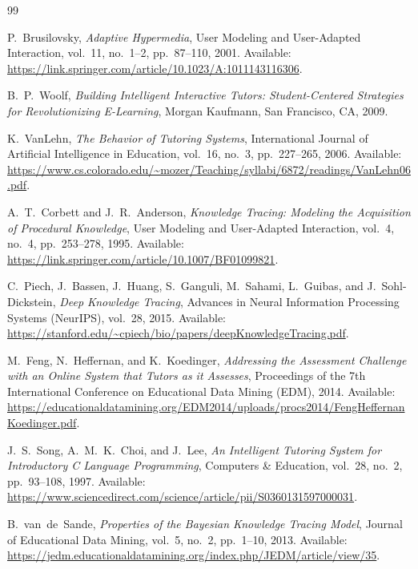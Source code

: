\documentclass{article}
\begin{document}
\newpage
\begin{thebibliography}{99}

P.~Brusilovsky,
\textit{Adaptive Hypermedia},
User Modeling and User-Adapted Interaction, vol.~11, no.~1--2, pp.~87--110, 2001.
Available: \url{https://link.springer.com/article/10.1023/A:1011143116306}.

B.~P.~Woolf,
\textit{Building Intelligent Interactive Tutors: Student-Centered Strategies for Revolutionizing E-Learning},
Morgan Kaufmann, San Francisco, CA, 2009.

K.~VanLehn,
\textit{The Behavior of Tutoring Systems},
International Journal of Artificial Intelligence in Education, vol.~16, no.~3, pp.~227--265, 2006.
Available: \url{https://www.cs.colorado.edu/~mozer/Teaching/syllabi/6872/readings/VanLehn06.pdf}.

A.~T.~Corbett and J.~R.~Anderson,
\textit{Knowledge Tracing: Modeling the Acquisition of Procedural Knowledge},
User Modeling and User-Adapted Interaction, vol.~4, no.~4, pp.~253--278, 1995.
Available: \url{https://link.springer.com/article/10.1007/BF01099821}.

C.~Piech, J.~Bassen, J.~Huang, S.~Ganguli, M.~Sahami, L.~Guibas, and J.~Sohl-Dickstein,
\textit{Deep Knowledge Tracing},
Advances in Neural Information Processing Systems (NeurIPS), vol.~28, 2015.
Available: \url{https://stanford.edu/~cpiech/bio/papers/deepKnowledgeTracing.pdf}.

M.~Feng, N.~Heffernan, and K.~Koedinger,
\textit{Addressing the Assessment Challenge with an Online System that Tutors as it Assesses},
Proceedings of the 7th International Conference on Educational Data Mining (EDM), 2014.
Available: \url{https://educationaldatamining.org/EDM2014/uploads/procs2014/FengHeffernanKoedinger.pdf}.

J.~S.~Song, A.~M.~K.~Choi, and J.~Lee,
\textit{An Intelligent Tutoring System for Introductory C Language Programming},
Computers \& Education, vol.~28, no.~2, pp.~93--108, 1997.
Available: \url{https://www.sciencedirect.com/science/article/pii/S0360131597000031}.

B.~van~de~Sande,
\textit{Properties of the Bayesian Knowledge Tracing Model},
Journal of Educational Data Mining, vol.~5, no.~2, pp.~1--10, 2013.
Available: \url{https://jedm.educationaldatamining.org/index.php/JEDM/article/view/35}.


\end{thebibliography}
\end{document}
